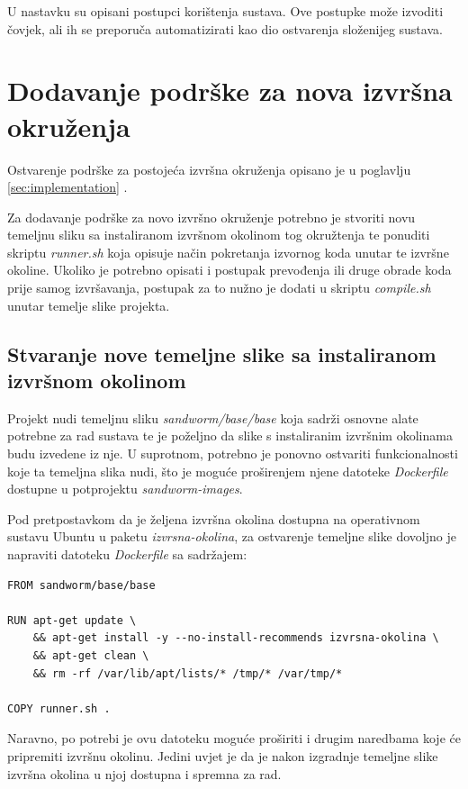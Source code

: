 \documentclass[times, utf8, zavrsni]{fer}
\begin{document}
{{\begin{appendices}
U nastavku su opisani postupci korištenja sustava. Ove postupke može izvoditi čovjek, ali ih se preporuča automatizirati kao dio ostvarenja složenijeg sustava.

\section{Dodavanje podrške za nova izvršna okruženja}

Ostvarenje podrške za postojeća izvršna okruženja opisano je u poglavlju \ref{sec:implementation} .

Za dodavanje podrške za novo izvršno okruženje potrebno je stvoriti novu temeljnu sliku sa instaliranom izvršnom okolinom tog okružtenja te ponuditi skriptu {\textit{runner.sh}} koja opisuje način pokretanja izvornog koda unutar te izvršne okoline. Ukoliko je potrebno opisati i postupak prevođenja ili druge obrade koda prije samog izvršavanja, postupak za to nužno je dodati u skriptu {\textit{compile.sh}} unutar temelje slike projekta.

\subsection{Stvaranje nove temeljne slike sa instaliranom izvršnom okolinom}

Projekt nudi temeljnu sliku {\textit{sandworm/base/base}} koja sadrži osnovne alate potrebne za rad sustava te je poželjno da slike s instaliranim izvršnim okolinama budu izvedene iz nje. U suprotnom, potrebno je ponovno ostvariti funkcionalnosti koje ta temeljna slika nudi, što je moguće proširenjem njene datoteke {\textit{Dockerfile}} dostupne u potprojektu {\textit{sandworm-images}}.

Pod pretpostavkom da je željena izvršna okolina dostupna na operativnom sustavu Ubuntu u paketu {\textit{izvrsna-okolina}}, za ostvarenje temeljne slike dovoljno je napraviti datoteku {\textit{Dockerfile}} sa sadržajem:

\begin{lstlisting}
FROM sandworm/base/base

RUN apt-get update \
    && apt-get install -y --no-install-recommends izvrsna-okolina \
    && apt-get clean \
    && rm -rf /var/lib/apt/lists/* /tmp/* /var/tmp/*

COPY runner.sh .
\end{lstlisting}

Naravno, po potrebi je ovu datoteku moguće proširiti i drugim naredbama koje će pripremiti izvršnu okolinu. Jedini uvjet je da je nakon izgradnje temeljne slike izvršna okolina u njoj dostupna i spremna za rad.


\end{appendices}}}
\end{document}

